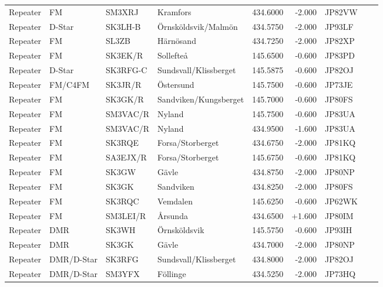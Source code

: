 \begin{longtable}{llllrrlcl}
	Repeater & FM         & SM3XRJ   & Kramfors               &   434.6000 &   -2.000 & JP82VW &  &  \\
	Repeater & D-Star     & SK3LH-B  & Örnsköldsvik/Malmön    &   434.5750 &   -2.000 & JP93LF &  &  \\
	Repeater & FM         & SL3ZB    & Härnösand              &   434.7250 &   -2.000 & JP82XP &  &  \\
	Repeater & FM         & SK3EK/R  & Sollefteå              &   145.6500 &   -0.600 & JP83PD &  &  \\
	Repeater & D-Star     & SK3RFG-C & Sundsvall/Klissberget  &   145.5875 &   -0.600 & JP82OJ &  &  \\
	Repeater & FM/C4FM    & SK3JR/R  & Östersund              &   145.7500 &   -0.600 & JP73JE &  &  \\
	Repeater & FM         & SK3GK/R  & Sandviken/Kungsberget  &   145.7000 &   -0.600 & JP80FS &  &  \\
	Repeater & FM         & SM3VAC/R & Nyland                 &   145.7500 &   -0.600 & JP83UA &  &  \\
	Repeater & FM         & SM3VAC/R & Nyland                 &   434.9500 &   -1.600 & JP83UA &  &  \\
	Repeater & FM         & SK3RQE   & Forsa/Storberget       &   434.6750 &   -2.000 & JP81KQ &  &  \\
	Repeater & FM         & SA3EJX/R & Forsa/Storberget       &   145.6750 &   -0.600 & JP81KQ &  &  \\
	Repeater & FM         & SK3GW    & Gävle                  &   434.8750 &   -2.000 & JP80NP &  &  \\
	Repeater & FM         & SK3GK    & Sandviken              &   434.8250 &   -2.000 & JP80FS &  &  \\
	Repeater & FM         & SK3RQC   & Vemdalen               &   145.6250 &   -0.600 & JP62WK &  &  \\
	Repeater & FM         & SM3LEI/R & Årsunda                &   434.6500 &   +1.600 & JP80IM &  &  \\
	Repeater & DMR        & SK3WH    & Örnsköldsvik           &   145.5750 &   -0.600 & JP93IH &  &  \\
	Repeater & DMR        & SK3GK    & Gävle                  &   434.7000 &   -2.000 & JP80NP &  &  \\
	Repeater & DMR/D-Star & SK3RFG   & Sundsvall/Klissberget  &   434.8000 &   -2.000 & JP82OJ &  &  \\
	Repeater & DMR/D-Star & SM3YFX   & Föllinge               &   434.5250 &   -2.000 & JP73HQ &  &  \\

\end{longtable}
